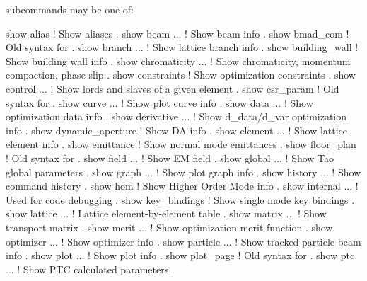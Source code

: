 {{{{{{{ subcommands may be one of:
\begin{example}
  show alias                   ! Show aliases .
  show beam ...                ! Show beam info .
  show bmad_com                ! Old syntax for  .
  show branch ...              ! Show lattice branch info .
  show building_wall           ! Show building wall info .
  show chromaticity ...        ! Show chromaticity, momentum compaction, phase slip .
  show constraints             ! Show optimization constraints .
  show control ...             ! Show lords and slaves of a given element .
  show csr_param               ! Old syntax for  .
  show curve ...               ! Show plot curve info .
  show data ...                ! Show optimization data info .
  show derivative ...          ! Show d_data/d_var optimization info .
  show dynamic_aperture        ! Show DA info .
  show element ...             ! Show lattice element info .
  show emittance               ! Show normal mode emittances .
  show floor_plan              ! Old syntax for  .
  show field ...               ! Show EM field .
  show global ...              ! Show Tao global parameters .
  show graph ...               ! Show plot graph info .
  show history ...             ! Show command history .
  show hom                     ! Show Higher Order Mode info .
  show internal ...            ! Used for code debugging .
  show key_bindings            ! Show single mode key bindings .
  show lattice ...             ! Lattice element-by-element table .
  show matrix ...              ! Show transport matrix .
  show merit ...               ! Show optimization merit function .
  show optimizer ...           ! Show optimizer info .
  show particle ...            ! Show tracked particle beam info .
  show plot ...                ! Show plot info .
  show plot_page               ! Old syntax for  .
  show ptc ...                 ! Show PTC calculated parameters .

\end{example}}}}}}}}
